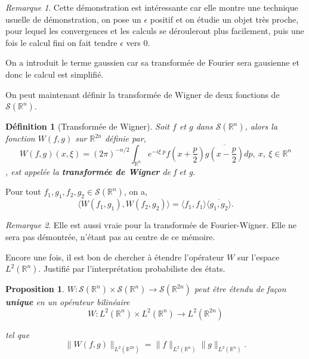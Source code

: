 \documentclass[a4paper, 12pt]{report}
\newcommand{\R}{\mathbb{R}} %
\newcommand{\ra}[1][]{\overset{#1}{\rightarrow}} %
\renewcommand{\.}{\cdot} %
\theoremstyle{break}
\newtheorem{definition}{Définition}
\newtheorem{proposition}{Proposition}
\theoremstyle{remark}
\newtheorem{remark}{Remarque}
\theoremstyle{proofstyle}
\begin{document}
\begin{remark}
    Cette démonstration est intéressante car elle montre une technique usuelle de démonstration, on pose un $\epsilon$ positif et on étudie un objet très proche, pour lequel les convergences et les calculs se dérouleront plus facilement, puis une fois le calcul fini on fait tendre $\epsilon$ vers $0$.

    On a introduit le terme gaussien car sa transformée de Fourier sera gausienne et donc le calcul est simplifié.
\end{remark}



On peut maintenant définir la transformée de Wigner de deux fonctions de $\mathcal{S}(\R^n)$.

\begin{definition}[Transformée de Wigner]
    Soit $f$ et $g$ dans $\mathcal{S}(\R^n)$, alors la fonction $W(f,g)$ sur $\R^{2n}$ définie par,
    $$W(f,g)(x, \xi) = (2 \pi)^{-n/2} \int_{\R^n} e^{-i \xi \; p} f\left(x+\frac{p}{2}\right) \overline{g\left(x-\frac{p}{2}\right)} dp, ~x, ~\xi \in \R^n$$,
    est appelée la \textbf{transformée de Wigner} de f et g.
\end{definition}

\begin{theorem}
    Pour tout $f_1, g_1, f_2, g_2 \in \mathcal{S}(\R^n)$, on a,
    $$\langle W(f_1, g_1), W(f_2, g_2) \rangle = \langle f_1, f_1 \rangle \overline{\langle g_1,g_2 \rangle}.$$
\end{theorem}

\begin{remark}
    Elle est aussi vraie pour la transformée de Fourier-Wigner. Elle ne sera pas démontrée, n'étant pas au centre de ce mémoire.
\end{remark}

Encore une fois, il est bon de chercher à étendre l'opérateur $W$ sur l'espace $L^2(\R^n)$. Justifié par l'interprétation probabiliste des états.

\begin{proposition}%
    $W : \mathcal{S}(\R^n) \times \mathcal{S}(\R^n) \ra \mathcal{S}(\R^{2n})$ peut être étendu de façon \textbf{unique} en un opérateur bilinéaire
    $$W : L^2(\R^n) \times L^2(\R^n) \ra L^2(\R^{2n})$$

    tel que
    $$\|W(f,g)\|_{L^2(\R^{2n})}=\|f\|_{L^2(\R^n)}\|g\|_{L^2(\R^n)}.$$
\end{proposition}
\end{document}
